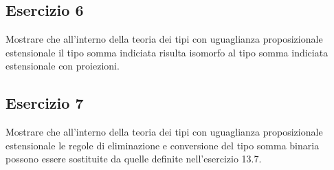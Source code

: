 \subsection{Esercizio 6}
\begin{thm}
	Mostrare che all’interno della teoria dei tipi con uguaglianza proposizionale estensionale il tipo somma indiciata risulta isomorfo al tipo somma indiciata estensionale con proiezioni.
\end{thm}


\subsection{Esercizio 7}
\begin{thm}
	Mostrare che all’interno della teoria dei tipi con uguaglianza proposizionale estensionale le regole di eliminazione e conversione del tipo somma binaria possono essere sostituite da quelle definite nell'esercizio 13.7.
\end{thm}
